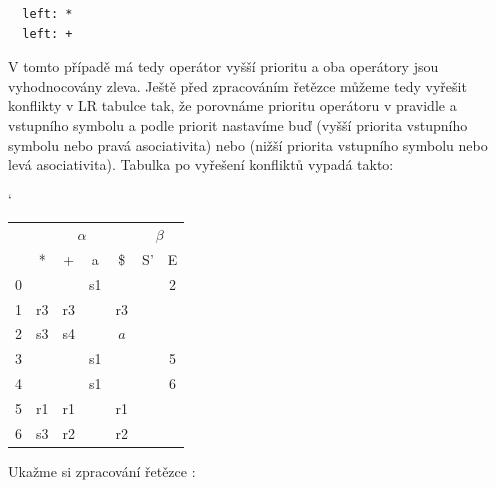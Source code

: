 \begin{exmp}
\begin{lstlisting}
  left: *
  left: +
\end{lstlisting}

V tomto případě má tedy operátor  \symb{*} vyšší prioritu a oba operátory jsou vyhodnocovány zleva.
Ještě před zpracováním řetězce můžeme tedy vyřešit konflikty v LR tabulce tak,
že porovnáme prioritu operátoru v  pravidle a vstupního symbolu
a podle priorit nastavíme buď  (vyšší priorita vstupního symbolu nebo pravá asociativita)
nebo  (nižší priorita vstupního symbolu nebo levá asociativita).
Tabulka po vyřešení konfliktů vypadá takto:

\begin{table}[H]
  \catcode`
  \centering
  \begin{tabular}{| c || c | c | c | c || c | c |}
    \hline
    \multirow{2}{*}{} & \multicolumn{4}{c||}{$\alpha$}& \multicolumn{2}{c|}{$\beta$} \\
    \cline{2-7}
      & * & + & a & \$& S'& E \\
    \hhline{|=||=|=|=|=||=|=|}
    0 &   &   & s1 &   &   & 2 \\
    \hline
    1 & r3 & r3 &   & r3 &   &   \\
    \hline
    2 & s3 & s4 &   & $a$ &   &   \\
    \hline
    3 &   &   & s1 &   &   & 5 \\
    \hline
    4 &   &   & s1 &   &   & 6 \\
    \hline
    5 & r1 &  r1 & & r1 &   & \\
    \hline
    6 & s3 &  r2 & & r2 &   & \\
    \hline
  \end{tabular}
\end{table}

Ukažme si zpracování řetězce :
\begin{figure}[H]
  \centering
\end{figure}


\end{exmp}
